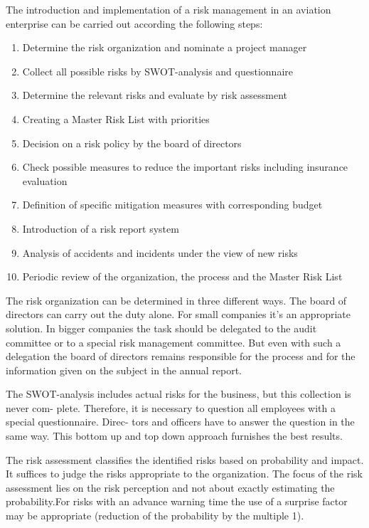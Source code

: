 \documentclass[a4paper, 10pt]{article}
\begin{document}
The introduction and implementation of a risk management in an aviation enterprise can be
carried out according the following steps:
\begin{enumerate}
		\item Determine the risk organization and nominate a project manager
		\item Collect all possible risks by SWOT-analysis and questionnaire
		\item Determine the relevant risks and evaluate by risk assessment
		\item Creating a Master Risk List with priorities
		\item Decision on a risk policy by the board of directors
		\item Check possible measures to reduce the important risks including insurance evaluation
		\item Definition of specific mitigation measures with corresponding budget
		\item Introduction of a risk report system
		\item Analysis of accidents and incidents under the view of new risks
		\item Periodic review of the organization, the process and the Master Risk List
\end{enumerate} \par

The risk organization can be determined in three different ways. The board of directors can
carry out the duty alone. For small companies it's an appropriate solution. In bigger companies
the task should be delegated to the audit committee or to a special risk management
committee. But even with such a delegation the board of directors remains responsible for the
process and for the information given on the subject in the annual report.\par

The SWOT-analysis includes actual risks for the business, but this collection is never com-
plete. Therefore, it is necessary to question all employees with a special questionnaire. Direc-
tors and officers have to answer the question in the same way. This bottom up and top down
approach furnishes the best results.\par

The risk assessment classifies the identified risks based on probability and impact. It suffices
to judge the risks appropriate to the organization. The focus of the risk assessment lies on the
risk perception and not about exactly estimating the probability.For risks with an advance warning time the
use of a surprise factor may be appropriate (reduction of the probability by the multiple 1). \par
\end{document}
